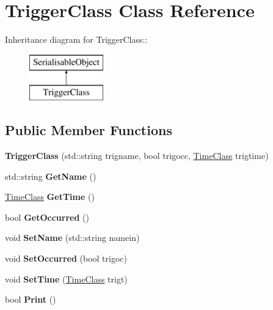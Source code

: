 \hypertarget{classTriggerClass}{
\section{TriggerClass Class Reference}
\label{classTriggerClass}
}
Inheritance diagram for TriggerClass::\begin{figure}[H]
\begin{center}
\leavevmode
\includegraphics[height=2cm]{classTriggerClass}
\end{center}
\end{figure}
\subsection*{Public Member Functions}
\begin{DoxyCompactItemize}
\item 
\hypertarget{classTriggerClass_a9f357ce4ca5ef8ec90d8266812254c80}{
{\bfseries TriggerClass} (std::string trigname, bool trigocc, \hyperlink{classTimeClass}{TimeClass} trigtime)}
\label{classTriggerClass_a9f357ce4ca5ef8ec90d8266812254c80}

\item 
\hypertarget{classTriggerClass_a1e61f6eb6f17e9adfe4c2c3c2a716cf4}{
std::string {\bfseries GetName} ()}
\label{classTriggerClass_a1e61f6eb6f17e9adfe4c2c3c2a716cf4}

\item 
\hypertarget{classTriggerClass_aeac33b25957d156fc4c61afd97738732}{
\hyperlink{classTimeClass}{TimeClass} {\bfseries GetTime} ()}
\label{classTriggerClass_aeac33b25957d156fc4c61afd97738732}

\item 
\hypertarget{classTriggerClass_a02db7d69bdb11b2f4c6f3c1cbd55eebe}{
bool {\bfseries GetOccurred} ()}
\label{classTriggerClass_a02db7d69bdb11b2f4c6f3c1cbd55eebe}

\item 
\hypertarget{classTriggerClass_a57f22d137aefc8e9582c995c3f7ccf02}{
void {\bfseries SetName} (std::string namein)}
\label{classTriggerClass_a57f22d137aefc8e9582c995c3f7ccf02}

\item 
\hypertarget{classTriggerClass_ae63e127367c5fde471fe91edad3aa8f3}{
void {\bfseries SetOccurred} (bool trigoc)}
\label{classTriggerClass_ae63e127367c5fde471fe91edad3aa8f3}

\item 
\hypertarget{classTriggerClass_a19124a1a8bbae6ca485878422c827cdf}{
void {\bfseries SetTime} (\hyperlink{classTimeClass}{TimeClass} trigt)}
\label{classTriggerClass_a19124a1a8bbae6ca485878422c827cdf}

\item 
\hypertarget{classTriggerClass_ad1938d5ca4ae67263fde1b678a36623a}{
bool {\bfseries Print} ()}
\label{classTriggerClass_ad1938d5ca4ae67263fde1b678a36623a}

\end{DoxyCompactItemize}

